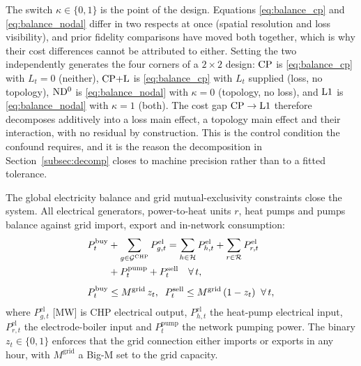 The switch $\kappa \in \{0,1\}$ is the point of the design. Equations
\eqref{eq:balance_cp} and \eqref{eq:balance_nodal} differ in two respects at once
(spatial resolution and loss visibility), and prior fidelity comparisons have moved both
together, which is why their cost differences cannot be attributed to either. Setting the
two independently generates the four corners of a $2\times2$ design: $\mathrm{CP}$ is
\eqref{eq:balance_cp} with $L_t = 0$ (neither), $\mathrm{CP{+}L}$ is \eqref{eq:balance_cp} with
$L_t$ supplied (loss, no topology), $\mathrm{ND^{0}}$ is \eqref{eq:balance_nodal} with $\kappa = 0$
(topology, no loss), and $\mathrm{L1}$ is \eqref{eq:balance_nodal} with $\kappa = 1$ (both).
The cost gap $\mathrm{CP} \to \mathrm{L1}$ therefore decomposes additively into a loss main effect, a
topology main effect and their interaction, with no residual by construction. This is the
control condition the confound requires, and it is the reason the decomposition in
Section~\ref{subsec:decomp} closes to machine precision rather than to a fitted
tolerance.

The global electricity balance and grid mutual-exclusivity constraints close the system.
All electrical generators, power-to-heat units $r$, heat pumps and pumps balance against
grid import, export and in-network consumption:
%
\begin{align}
  P_t^{\mathrm{buy}}
    &+ \sum_{g \in \mathcal{G}^{\mathrm{CHP}}} P_{g,t}^{\mathrm{el}}
  = \sum_{h \in \mathcal{H}} P_{h,t}^{\mathrm{el}}
    + \sum_{r \in \mathcal{R}} P_{r,t}^{\mathrm{el}} \notag \\
    &+ P_t^{\mathrm{pump}} + P_t^{\mathrm{sell}}
  \quad \forall\, t,
  \label{eq:balance_el} \\[4pt]
  P_t^{\mathrm{buy}} &\leq M^{\mathrm{grid}}\, z_t,
  \;\;
  P_t^{\mathrm{sell}} \leq M^{\mathrm{grid}}\, (1 - z_t)
  \;\; \forall\, t,
  \label{eq:grid_bigm}
\end{align}
%
where $P_{g,t}^{\mathrm{el}}$ [MW] is CHP electrical output, $P_{h,t}^{\mathrm{el}}$ the
heat-pump electrical input, $P_{r,t}^{\mathrm{el}}$ the electrode-boiler input and
$P_t^{\mathrm{pump}}$ the network pumping power. The binary $z_t \in \{0,1\}$ enforces
that the grid connection either imports or exports in any hour, with $M^{\mathrm{grid}}$
a Big-M set to the grid capacity.

